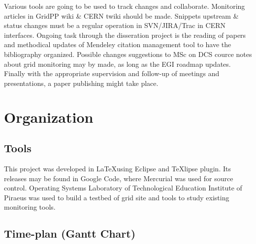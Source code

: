 Various tools are going to be used to track changes and collaborate. Monitoring
articles in GridPP wiki \& CERN twiki should be made. Snippets upstream \&
status changes must be a regular operation in SVN/JIRA/Trac in CERN interfaces.
Ongoing task through the disseration project is the reading of papers and
methodical updates of Mendeley citation management tool to have the bibliography
organized. Possible changes suggestions to MSc on DCS cource notes about grid
monitoring may by made, as long as the EGI roadmap updates. Finally with the
appropriate supervision and follow-up of meetings and presentations, a paper publishing
might take place.



\section{Organization}

\subsection[Tools]{Tools}
This project was developed in \LaTeX using Eclipse and TeXlipse plugin. Its
releases may be found in Google Code, where Mercurial was used for source
control. Operating Systems Laboratory of Technological Education Institute of
Piraeus was used to build a testbed of grid site and tools to study existing
monitoring tools.

\subsection[Time plan]{Time-plan (Gantt Chart)}

